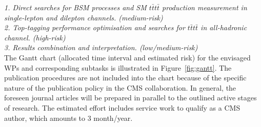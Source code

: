 %
%
%

\noindent\textit{1. Direct searches for BSM processes and SM $t\bar{t}t\bar{t}$ production measurement in single-lepton and dilepton channels. (medium-risk)}\\



\noindent\textit{2. Top-tagging performance optimisation and searches for $t\bar{t}t\bar{t}$ in all-hadronic channel. (high-risk)}\\



\noindent\textit{3. Results combination and interpretation. (low/medium-risk)}\\



The Gantt chart (allocated time interval and estimated risk) for the envisaged WPs and corresponding subtasks is illustrated in Figure~\ref{fig:gantt}. The publication procedures are not included into the chart because of the specific nature of the publication policy in the CMS collaboration. In general, the foreseen journal articles will be prepared in parallel to the outlined active stages of research. The estimated effort includes service work to qualify as a CMS author, which amounts to 3 month/year.
%